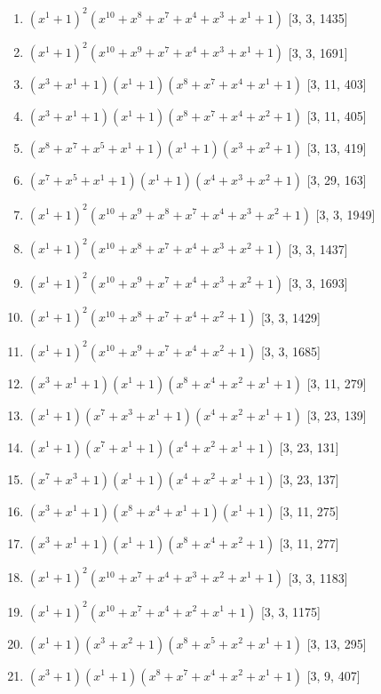 \documentclass[10pt,twocolumn]{article}
\begin{document}
\begin{enumerate}
\item $(x^{1} + 1)^{2}(x^{10} + x^{8} + x^{7} + x^{4} + x^{3} + x^{1} + 1)$  [3, 3, 1435]
\item $(x^{1} + 1)^{2}(x^{10} + x^{9} + x^{7} + x^{4} + x^{3} + x^{1} + 1)$  [3, 3, 1691]
\item $(x^{3} + x^{1} + 1)(x^{1} + 1)(x^{8} + x^{7} + x^{4} + x^{1} + 1)$  [3, 11, 403]
\item $(x^{3} + x^{1} + 1)(x^{1} + 1)(x^{8} + x^{7} + x^{4} + x^{2} + 1)$  [3, 11, 405]
\item $(x^{8} + x^{7} + x^{5} + x^{1} + 1)(x^{1} + 1)(x^{3} + x^{2} + 1)$  [3, 13, 419]
\item $(x^{7} + x^{5} + x^{1} + 1)(x^{1} + 1)(x^{4} + x^{3} + x^{2} + 1)$  [3, 29, 163]
\item $(x^{1} + 1)^{2}(x^{10} + x^{9} + x^{8} + x^{7} + x^{4} + x^{3} + x^{2} + 1)$  [3, 3, 1949]
\item $(x^{1} + 1)^{2}(x^{10} + x^{8} + x^{7} + x^{4} + x^{3} + x^{2} + 1)$  [3, 3, 1437]
\item $(x^{1} + 1)^{2}(x^{10} + x^{9} + x^{7} + x^{4} + x^{3} + x^{2} + 1)$  [3, 3, 1693]
\item $(x^{1} + 1)^{2}(x^{10} + x^{8} + x^{7} + x^{4} + x^{2} + 1)$  [3, 3, 1429]
\item $(x^{1} + 1)^{2}(x^{10} + x^{9} + x^{7} + x^{4} + x^{2} + 1)$  [3, 3, 1685]
\item $(x^{3} + x^{1} + 1)(x^{1} + 1)(x^{8} + x^{4} + x^{2} + x^{1} + 1)$  [3, 11, 279]
\item $(x^{1} + 1)(x^{7} + x^{3} + x^{1} + 1)(x^{4} + x^{2} + x^{1} + 1)$  [3, 23, 139]
\item $(x^{1} + 1)(x^{7} + x^{1} + 1)(x^{4} + x^{2} + x^{1} + 1)$  [3, 23, 131]
\item $(x^{7} + x^{3} + 1)(x^{1} + 1)(x^{4} + x^{2} + x^{1} + 1)$  [3, 23, 137]
\item $(x^{3} + x^{1} + 1)(x^{8} + x^{4} + x^{1} + 1)(x^{1} + 1)$  [3, 11, 275]
\item $(x^{3} + x^{1} + 1)(x^{1} + 1)(x^{8} + x^{4} + x^{2} + 1)$  [3, 11, 277]
\item $(x^{1} + 1)^{2}(x^{10} + x^{7} + x^{4} + x^{3} + x^{2} + x^{1} + 1)$  [3, 3, 1183]
\item $(x^{1} + 1)^{2}(x^{10} + x^{7} + x^{4} + x^{2} + x^{1} + 1)$  [3, 3, 1175]
\item $(x^{1} + 1)(x^{3} + x^{2} + 1)(x^{8} + x^{5} + x^{2} + x^{1} + 1)$  [3, 13, 295]
\item $(x^{3} + 1)(x^{1} + 1)(x^{8} + x^{7} + x^{4} + x^{2} + x^{1} + 1)$  [3, 9, 407]

\end{enumerate}
\end{document}
